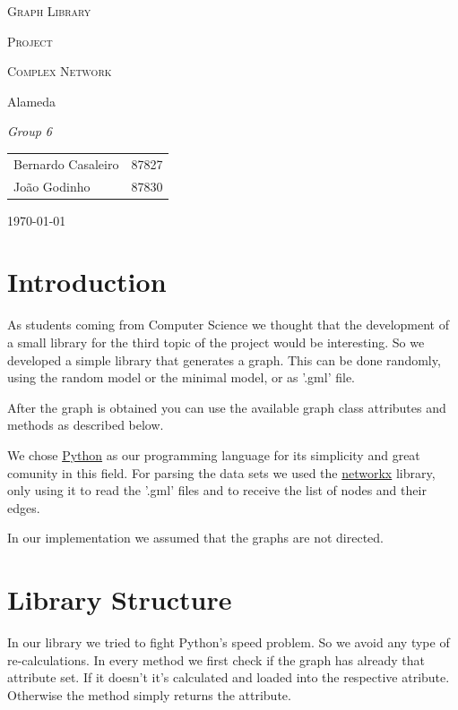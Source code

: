 \documentclass[a4paper,titlepage,11pt]{article}
\begin{document}
\begin{titlepage}
  \begin{center}
    {\scshape \huge Graph Library \par}
    \vspace{1cm}

    {\scshape \LARGE Project \par}
    \vspace{1.5cm}

    {\scshape \Large Complex Network \par}
    \vspace{0.5cm}

    {\Large Alameda \par}
    \vfill

    {\itshape \Large Group 6 \par}
    \vfill

    \begin{tabular}{l l}
      Bernardo Casaleiro & 87827\\
      João Godinho & 87830\\
    \end{tabular}
    \vfill

    {\large \today\par}
  \end{center}
\end{titlepage}

\section{Introduction}
As students coming from Computer Science we thought that the development of a small library for the third topic of the project would be interesting.
So we developed a simple library that generates a graph. This can be done randomly, using the random model or the minimal model, or as '.gml' file.

After the graph is obtained you can use the available graph class attributes and methods as described below.

We chose \href{https://www.python.org}{Python} as our programming language for its simplicity and great comunity in this field.
For parsing the data sets we used the \href{https://networkx.github.io}{networkx} library, only using it to read the  '.gml' files and to receive the list of nodes and their edges.

In our implementation we assumed that the graphs are not directed.

\section{Library Structure}
In our library we tried to fight Python's speed problem. So we avoid any type of re-calculations.
In every method we first check if the graph has already that attribute set.
If it doesn't it's calculated and loaded into the respective atribute. Otherwise the method simply returns the attribute.
\end{document}
